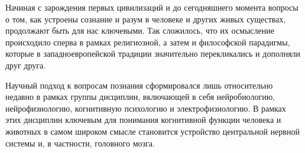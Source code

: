


{\actuality}


Начиная с зарождения первых цивилизаций и до сегодняшнего момента вопросы о
том, как устроены сознание и разум в человеке и других живых существах,
продолжают быть для нас ключевыми.  Так сложилось, что их осмысление
происходило сперва в рамках религиозной, а затем и философской парадигмы,
которые в западноевропейской традиции значительно перекликались и дополняли
друг друга.

Научный подход к вопросам познания сформировался лишь относительно недавно в
рамках группы дисциплин, включающей в себя нейробиологию, нейрофизиологию,
когнитивную психологию и электрофизиологию. В рамках этих дисциплин ключевым
для понимания когнитивной функции человека и животных в самом широком смысле
становится устройство центральной нервной системы и, в частности, головного
мозга.

